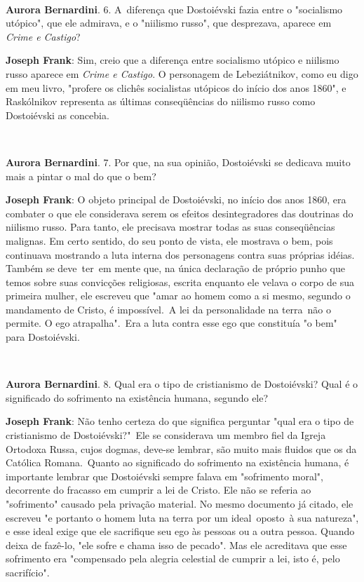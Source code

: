 ~

\textbf{Aurora Bernardini}. 6. A~diferença que Dostoiévski fazia entre o
"socialismo utópico", que ele admirava, e o "niilismo russo", que
desprezava, aparece em \emph{Crime e Castigo}?

\textbf{Joseph Frank}: Sim, creio que a diferença entre socialismo
utópico e niilismo russo aparece em \emph{Crime e Castigo}. O personagem
de Lebeziátnikov, como eu digo em meu livro, "profere os clichês
socialistas utópicos do início dos anos 1860", e Raskólnikov representa
as últimas conseqüências do niilismo russo como Dostoiévski as concebia.

~

\textbf{Aurora Bernardini}. 7. Por que, na sua opinião, Dostoiévski se
dedicava muito mais a pintar o mal do que o bem?

\textbf{Joseph Frank}: O objeto principal de Dostoiévski, no início dos
anos 1860, era combater o que ele considerava serem os efeitos
desintegradores das doutrinas do niilismo russo. Para tanto, ele
precisava mostrar todas as suas conseqüências malignas. Em certo
sentido, do seu ponto de vista, ele mostrava o bem, pois continuava
mostrando a luta interna dos personagens contra suas próprias idéias.
Também se deve~ter~em mente que, na única declaração de próprio punho
que temos sobre suas convicções religiosas, escrita enquanto ele velava
o corpo de sua primeira mulher, ele escreveu que "amar ao homem como a
si mesmo, segundo o mandamento de Cristo, é impossível.~A lei da
personalidade na terra~não o permite. O ego atrapalha".~Era a luta
contra esse ego que constituía "o bem" para Dostoiévski.

~

\textbf{Aurora Bernardini}. 8. Qual era o tipo de cristianismo de
Dostoiévski? Qual é o significado do sofrimento na existência humana,
segundo ele?

\textbf{Joseph Frank}: Não tenho certeza do que significa perguntar
"qual era o tipo de cristianismo de Dostoiévski?"~Ele se considerava um
membro fiel da Igreja Ortodoxa Russa, cujos dogmas, deve-se lembrar, são
muito mais fluidos que os da Católica Romana.~Quanto ao significado do
sofrimento na existência humana, é importante lembrar que Dostoiévski
sempre falava em "sofrimento moral", decorrente do fracasso em cumprir a
lei de Cristo. Ele não se referia ao "sofrimento" causado pela privação
material. No mesmo documento já citado, ele escreveu "e portanto o homem
luta na terra por um ideal~oposto~à sua natureza", e esse ideal exige
que ele sacrifique seu ego às pessoas ou a outra pessoa. Quando deixa de
fazê-lo, "ele sofre e chama isso de pecado". Mas ele acreditava que esse
sofrimento era "compensado pela alegria celestial de cumprir a lei, isto
é, pelo sacrifício".

